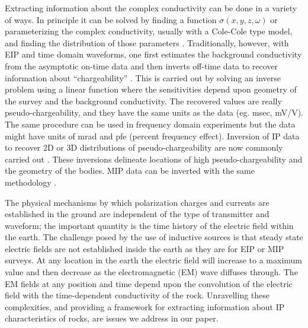 \documentclass[extra,mreferee]{gji}
\begin{document}
Extracting information about the complex conductivity can be done in a variety of ways. In principle it can be solved by finding a function $\sigma(x,y,z,\omega)$ or parameterizing the complex conductivity, usually with a Cole-Cole type model, and finding the distribution of those parameters \cite[]{Fiandaca2012, Marchant2013,Xu2013}. Traditionally, however, with EIP and time domain waveforms, one first estimates the background conductivity from the asymptotic on-time data and then inverts off-time data to recover information about ``chargeability'' \cite[]{doug1994}. This is carried out by solving an inverse problem using a linear function where the sensitivities depend upon geometry of the survey and the background conductivity. The recovered values are really pseudo-chargeability, and they have the same units as the data (eg. msec, mV/V). The same procedure can be used in frequency domain experiments but the data might have units of mrad and pfe (percent frequency effect). Inversion of IP data to recover 2D or 3D distributions of pseudo-chargeability are now commonly carried out \cite[]{Kemna2012}. These inversions delineate locations of high pseudo-chargeability and the geometry of the bodies. MIP data can be inverted with the same methodology \cite[]{Chen2003}. 

The physical mechanisms by which polarization charges and currents are established in the ground are independent of the type of transmitter and waveform; the important quantity is the time history of the electric field within the earth. The challenge posed by the use of  inductive sources is that steady state electric fields are not established inside the earth as they are for EIP or MIP surveys. At any location in the earth the electric field will increase to a maximum value and then decrease as the electromagnetic (EM) wave diffuses through. The EM fields at any position and time depend upon the convolution of the electric field with the time-dependent conductivity of the rock. Unravelling these complexities, and providing a framework for extracting information about IP characteristics of rocks, are issues we address in our paper. 
\end{document}
